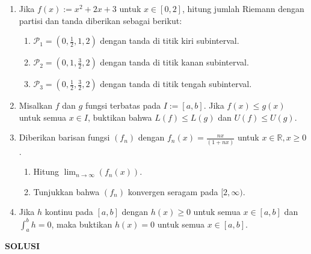 \documentclass[11pt,letterpaper]{article}
\begin{document}
\begin{enumerate}
  \item Jika $f(x) := x^2 + 2x + 3$ untuk $x \in [0,2]$, hitung jumlah Riemann dengan partisi dan tanda diberikan sebagai berikut:
        \begin{enumerate}[label=\alph*)]
          \item $\mathcal{P}_1 = (0, \frac{1}{2}, 1, 2)$ dengan tanda di titik kiri subinterval.
          \item $\mathcal{P}_2 = (0, 1, \frac{3}{2}, 2)$ dengan tanda di titik kanan subinterval.
          \item $\mathcal{P}_3 = (0, \frac{1}{2}, \frac{3}{2}, 2)$ dengan tanda di titik tengah subinterval.
        \end{enumerate}
  \item Misalkan $f$ dan $g$ fungsi terbatas pada $I := [a,b]$. Jika $f(x) \leq g(x)$ untuk semua $x \in I$, buktikan bahwa $L(f) \leq L(g)$ dan $U(f) \leq U(g)$.
  \item Diberikan barisan fungsi $(f_n)$ dengan $f_n(x) = \frac{nx}{(1+nx)}$ untuk $x \in \mathbb{R}, x \geq 0$.
        \begin{enumerate}[label=\alph*)]
          \item Hitung $\lim_{n \to \infty} (f_n(x))$.
          \item Tunjukkan bahwa $(f_n)$ konvergen seragam pada $[2, \infty)$.
        \end{enumerate}
  \item Jika $h$ kontinu pada $[a,b]$ dengan $h(x) \geq 0$ untuk semua $x \in [a,b]$ dan $\int_a^b h = 0$, maka buktikan $h(x) = 0$ untuk semua $x \in [a,b]$.
\end{enumerate}

\newpage
\begin{center}
  \textbf{SOLUSI}
\end{center}
\end{document}
